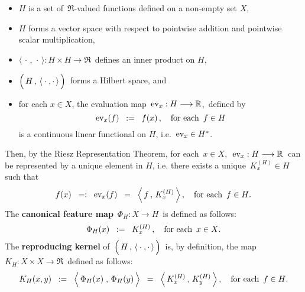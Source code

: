 \begin{definition}
\begin{itemize}
\item
	$H$ is a set of \,$\Re$-valued functions defined on a non-empty set $X$,
\item
	$H$ forms a vector space with respect to pointwise addition and pointwise scalar multiplication,
\item
	$\langle\,\cdot\,,\,\cdot\,\rangle : H \times H \longrightarrow \Re$\, defines an inner product on $H$,
\item
	$\left(\,H\,,\,\langle\,\overset{{\color{white}1}}{\cdot}\,,\cdot\,\rangle\,\right)$\,
	forms a Hilbert space, and
\item
	for each $x \in X$, the evaluation map \,$\textnormal{ev}_{x} : H \longrightarrow \mathbb{R}$,\, defined by
	\begin{equation*}
	\textnormal{ev}_{x}(f) \;\; := \;\; f(x)\,,
	\quad
	\textnormal{for each \,$f \in H$}
	\end{equation*}
	is a continuous linear functional on $H$, i.e. \,$\textnormal{ev}_{x} \in H^{*}$.
\end{itemize}
Then, by the Riesz Representation Theorem, for each \,$x \in X$,\,
\,$\textnormal{ev}_{x} : H \longrightarrow \mathbb{R}$\,
can be represented by a unique element in $H$,
i.e. there exists a unique \,$K^{(H)}_{x} \in H$\, such that
\begin{equation*}
f(x)
\;\; =: \;\;
	\textnormal{ev}_{x}(f)
\;\; = \;\;
	\left\langle\,f\,,\,K^{(H)}_{x}\,\right\rangle,
\quad
\textnormal{for each \,$f \in H$}.
\end{equation*}
The \textbf{canonical feature map}
\,$\Phi_{H} : X \longrightarrow H$\,
is defined as follows:
\begin{equation*}
\Phi_{H}(x) \;\; := \;\; K^{(H)}_{x}\,,
\quad
\textnormal{for each \,$x\in X$}.
\end{equation*}
The \textbf{reproducing kernel} of
\,$\left(\,H\,,\,\langle\,\overset{{\color{white}1}}{\cdot}\,,\cdot\,\rangle\,\right)$\,
is, by definition, the map
\,$K_{H} : X \times X \longrightarrow \Re$\, defined as follows:
\begin{equation*}
K_{H}(x,y)
\;\; := \;\;
	\left\langle\,\overset{{\color{white}.}}{\Phi_{H}(x)}\;,\,\Phi_{H}(y)\,\right\rangle
\;\; = \;\;
	\left\langle\,K^{(H)}_{x}\,,\,K^{(H)}_{y}\,\right\rangle,
\quad
\textnormal{for each \,$f \in H$}.
\end{equation*}
\end{definition}


